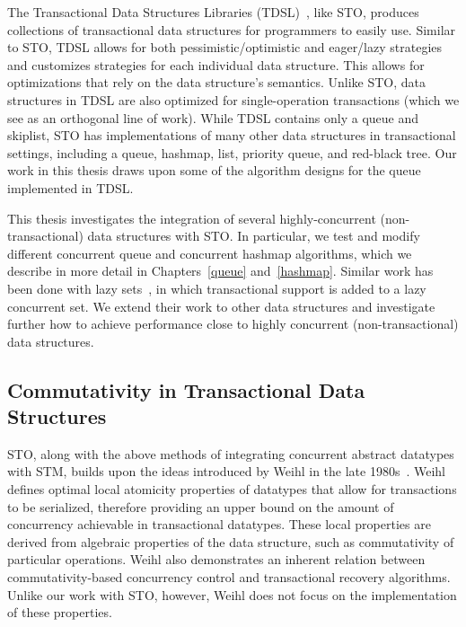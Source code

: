 The Transactional Data Structures Libraries (TDSL)~\cite{tdsl}, like STO, produces collections of transactional data structures for programmers to easily use. Similar to STO, TDSL allows for both pessimistic/optimistic and eager/lazy strategies and customizes strategies for each individual data structure. This allows for optimizations that rely on the data structure's semantics. Unlike STO, data structures in TDSL are also optimized for single-operation transactions (which we see as an orthogonal line of work). While TDSL contains only a queue and skiplist, STO has implementations of many other data structures in transactional settings, including a queue, hashmap, list, priority queue, and red-black tree. Our work in this thesis draws upon some of the algorithm designs for the queue implemented in TDSL.

This thesis investigates the integration of several highly-concurrent (non-transactional) data structures with STO. In particular, we test and modify different concurrent queue and concurrent hashmap algorithms, which we describe in more detail in Chapters~\ref{queue} and~\ref{hashmap}. Similar work has been done with lazy sets~\cite{lazyset}, in which transactional support is added to a lazy concurrent set. We extend their work to other data structures and investigate further how to achieve performance close to highly concurrent (non-transactional) data structures.

\subsection{Commutativity in Transactional Data Structures}

STO, along with the above methods of integrating concurrent abstract datatypes with STM, builds upon the ideas introduced by Weihl in the late 1980s~\cite{weihl}. Weihl defines optimal local atomicity properties of datatypes that allow for transactions to be serialized, therefore providing an upper bound on the amount of concurrency achievable in transactional datatypes. These local properties are derived from algebraic properties of the data structure, such as commutativity of particular operations. Weihl also demonstrates an inherent relation between commutativity-based concurrency control and transactional recovery algorithms. Unlike our work with STO, however, Weihl does not focus on the implementation of these properties.

